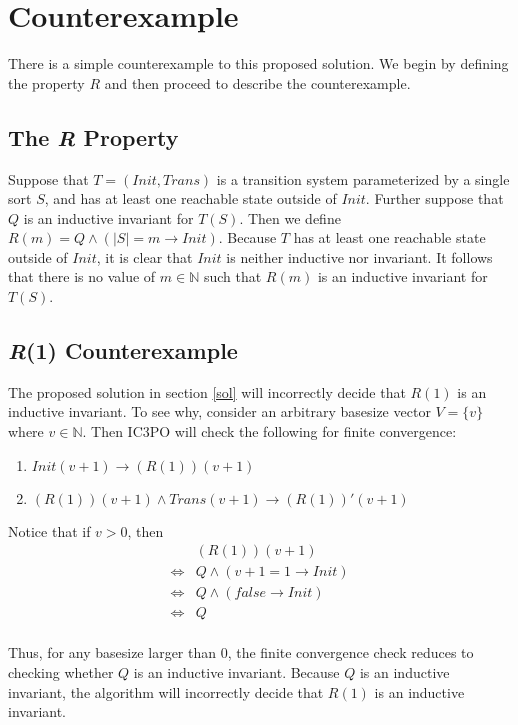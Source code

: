 \documentclass[12pt]{article}
\begin{document}
\section{Counterexample}
There is a simple counterexample to this proposed solution.  We begin by defining the property $R$ and then proceed to describe the counterexample.

\subsection{The \textit{R} Property}
Suppose that $T = (Init,Trans)$ is a transition system parameterized by a single sort $S$, and has at least one reachable state outside of $Init$.  Further suppose that $Q$ is an inductive invariant for $T(S)$.  Then we define $R(m) = Q \land (|S|=m \rightarrow Init)$.  Because $T$ has at least one reachable state outside of $Init$, it is clear that $Init$ is neither inductive nor invariant.  It follows that there is no value of $m \in \mathbb{N}$ such that $R(m)$ is an inductive invariant for $T(S)$.

\subsection{\textit{R}(1) Counterexample}
The proposed solution in section \ref{sol} will incorrectly decide that $R(1)$ is an inductive invariant.  To see why, consider an arbitrary basesize vector $V = \{v\}$ where $v \in \mathbb{N}$.  Then IC3PO will check the following for finite convergence:
\begin{enumerate}
  \item $Init(v+1) \rightarrow (R(1))(v+1)$
  \item $(R(1))(v+1) \land Trans(v+1) \rightarrow (R(1))'(v+1)$
\end{enumerate}

Notice that if $v>0$, then
\begin{align*}
  &(R(1))(v+1)\\
  \iff &Q \land (v+1=1 \rightarrow Init)\\
  \iff &Q \land (false \rightarrow Init)\\
  \iff &Q\\
\end{align*}

Thus, for any basesize larger than 0, the finite convergence check reduces to checking whether $Q$ is an inductive invariant.  Because $Q$ is an inductive invariant, the algorithm will incorrectly decide that $R(1)$ is an inductive invariant.
\end{document}

